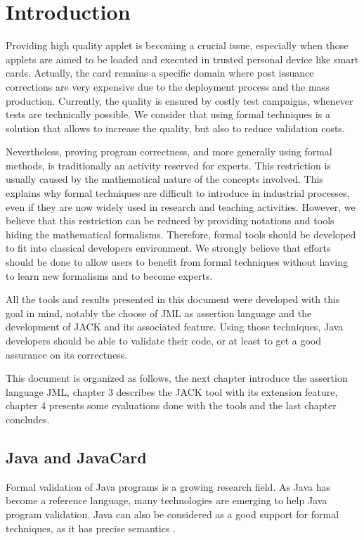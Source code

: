\chapter{Introduction}
Providing high quality applet is becoming a crucial issue, 
especially when those applets are aimed to be loaded and executed in trusted personal device like smart cards.  
Actually, the card remains a specific domain where post issuance corrections are very expensive due to the deployment process and the mass production.
Currently, the quality is ensured by costly test campaigns, 
whenever tests are technically possible. 
We consider that using formal techniques is a solution that allows to increase the quality, but also to reduce validation costs.

Nevertheless, proving program correctness, and more generally using
formal methods, is traditionally an activity reserved for experts.  
This restriction is usually caused by the mathematical nature of the concepts involved.
This explains why formal techniques are difficult to introduce in industrial processes, even if they are now widely used in research and teaching activities.
However, we believe that this restriction can be reduced by providing notations and tools hiding the mathematical formalisms.
Therefore, formal tools should be developed to fit into classical developers environment.
We strongly believe that efforts should be done to allow users to benefit from formal techniques without having to learn new formalisms and to become experts.

All the tools and results presented in this document were developed with this goal in mind, notably the choose of JML as assertion language and the development of JACK and its associated feature.
Using those techniques, Java developers should be able to validate their code, or at least to get a good assurance on its correctness.

This document is organized as follows, the next chapter introduce the assertion language JML, chapter 3 describes the JACK tool with its extension feature, chapter 4 presents some evaluations done with the tools and the last chapter concludes.


\section{Java and JavaCard}
 Formal validation of Java programs is a growing research
 field.  As Java has become a reference language, many technologies are
 emerging to help Java program validation.  Java can also be
 considered as a good support for formal techniques, as it has precise 
semantics \cite{Gosl00a}.

